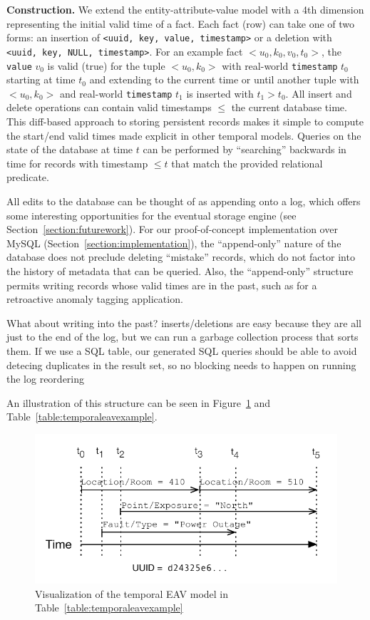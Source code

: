 \textbf{Construction.} We extend the entity-attribute-value model with a 4th dimension representing the initial
valid time of a fact. Each fact (row) can take one of two forms: an insertion of \texttt{<uuid, key, value, timestamp>}
or a deletion with \texttt{<uuid, key, NULL, timestamp>}. For an example fact $<u_0, k_0, v_0, t_0>$, the \texttt{value} $v_0$ is valid (true) for the tuple $<u_0, k_0>$
with real-world \texttt{timestamp} $t_0$ starting at time $t_0$ and extending to the current time or until another
tuple with $<u_0, k_0>$ and real-world \texttt{timestamp} $t_1$ is inserted with $t_1 > t_0$. All insert and delete operations
can contain valid timestamps $\leq$ the current database time. This diff-based approach
to storing persistent records makes it simple to compute the start/end valid times made explicit in other temporal models.
Queries on the state of the database at time $t$ can be performed by ``searching'' backwards in time for
records with timestamp $\leq t$ that match the provided relational predicate.

All edits to the database can be thought of as appending onto a log, which offers some interesting opportunities
for the eventual storage engine (see Section~\ref{section:futurework}). For our proof-of-concept implementation
over MySQL (Section~\ref{section:implementation}), the ``append-only'' nature of the database does not preclude
deleting ``mistake'' records, which do not factor into the history of metadata that can be queried. Also,
the ``append-only'' structure permits writing records whose valid times are in the past, such as for a retroactive anomaly
tagging application.

What about writing into the past? inserts/deletions are easy because they are all just to the end of the log, but
we can run a garbage collection process that sorts them. If we use a SQL table, our generated SQL queries should
be able to avoid detecing duplicates in the result set, so no blocking needs to happen on running the log reordering
\fi

An illustration of this structure can be seen in Figure~\ref{figure:temporaleavexample} and Table~\ref{table:temporaleavexample}.

\begin{figure}
\centering
\includegraphics[width=.9\linewidth]{figs/time.pdf}
\caption{Visualization of the temporal EAV model in Table~\ref{table:temporaleavexample}}
\label{figure:temporaleavexample}
\end{figure}


